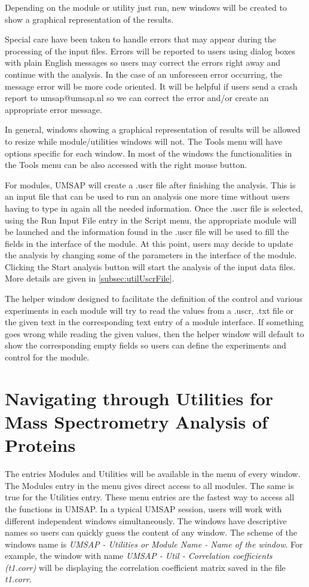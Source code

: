 Depending on the module or utility just run, new windows will be created to show a graphical representation of the results.

Special care have been taken to handle errors that may appear during the processing of the input files. Errors will be reported to users using dialog boxes with plain English messages so users may correct the errors right away and continue with the analysis. In the case of an unforeseen error occurring, the message error will be more code oriented. It will be helpful if users send a crash report to umsap@umsap.nl so we can correct the error and/or create an appropriate error message. 

In general, windows showing a graphical representation of results will be allowed to resize while module/utilities windows will not. The Tools menu will have options specific for each window. In most of the windows the functionalities in the Tools menu can be also accessed with the right mouse button.

For modules, UMSAP will create a .uscr\label{par:uscrFile} file after finishing the analysis. This is an input file that can be used to run an analysis one more time without users having to type in again all the needed information. Once the .uscr file is selected, using the Run Input File entry in the Script menu, the appropriate module will be launched and the information found in the .uscr file will be used to fill the fields in the interface of the module. At this point, users may decide to update the analysis by changing some of the parameters in the interface of the module. Clicking the Start analysis button will start the analysis of the input data files. More details are given in \autoref{subsec:utilUscrFile}.  

The helper window designed to facilitate the definition of the control and various experiments in each module will try to read the values from a .uscr, .txt file or the given text in the corresponding text entry of a module interface. If something goes wrong while reading the given values, then the helper window will default to show the corresponding empty fields so users can define the experiments and control for the module.

\section{Navigating through Utilities for Mass Spectrometry Analysis of Proteins}

The entries Modules and Utilities will be available in the menu of every window. The Modules entry in the menu gives direct access to all modules. The same is true for the Utilities entry. These menu entries are the fastest way to access all the functions in UMSAP. In a typical UMSAP session, users will work with different independent windows simultaneously. The windows have descriptive names so users can quickly guess the content of any window. The scheme of the windows name is \textit{UMSAP - Utilities or Module Name - Name of the window}. For example, the window with name \textit{UMSAP - Util - Correlation coefficients (t\num[detect-all]{1}.corr)} will be displaying the correlation coefficient matrix saved in the file \textit{t\num{1}.corr}.

